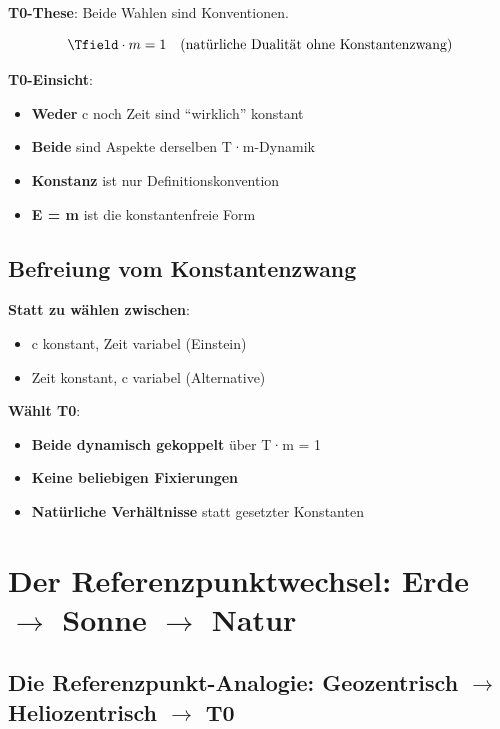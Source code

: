 	\textbf{T0-These}: Beide Wahlen sind Konventionen.
	
	\begin{equation}
		\Tfield \cdot m = 1 \quad \text{(natürliche Dualität ohne Konstantenzwang)}
	\end{equation}
	
	\textbf{T0-Einsicht}:
	\begin{itemize}
		\item \textbf{Weder} c noch Zeit sind ``wirklich'' konstant
		\item \textbf{Beide} sind Aspekte derselben T·m-Dynamik
		\item \textbf{Konstanz} ist nur Definitionskonvention
		\item \textbf{E = m} ist die konstantenfreie Form
	\end{itemize}
	
	\subsection{Befreiung vom Konstantenzwang}
	
	\textbf{Statt zu wählen zwischen}:
	\begin{itemize}
		\item c konstant, Zeit variabel (Einstein)
		\item Zeit konstant, c variabel (Alternative)
	\end{itemize}
	
	\textbf{Wählt T0}:
	\begin{itemize}
		\item \textbf{Beide dynamisch gekoppelt} über T·m = 1
		\item \textbf{Keine beliebigen Fixierungen}
		\item \textbf{Natürliche Verhältnisse} statt gesetzter Konstanten
	\end{itemize}
	
	\section{Der Referenzpunktwechsel: Erde $\rightarrow$ Sonne $\rightarrow$ Natur}
	
	\subsection{Die Referenzpunkt-Analogie: Geozentrisch $\rightarrow$ Heliozentrisch $\rightarrow$ T0}
	
